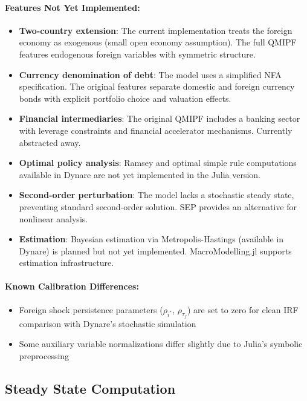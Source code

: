 \documentclass[12pt]{article}
\begin{document}
\paragraph{Features Not Yet Implemented:}
\begin{itemize}
\item \textbf{Two-country extension}: The current implementation treats the foreign economy as exogenous (small open economy assumption). The full QMIPF features endogenous foreign variables with symmetric structure.
\item \textbf{Currency denomination of debt}: The model uses a simplified NFA specification. The original features separate domestic and foreign currency bonds with explicit portfolio choice and valuation effects.
\item \textbf{Financial intermediaries}: The original QMIPF includes a banking sector with leverage constraints and financial accelerator mechanisms. Currently abstracted away.
\item \textbf{Optimal policy analysis}: Ramsey and optimal simple rule computations available in Dynare are not yet implemented in the Julia version.
\item \textbf{Second-order perturbation}: The model lacks a stochastic steady state, preventing standard second-order solution. SEP provides an alternative for nonlinear analysis.
\item \textbf{Estimation}: Bayesian estimation via Metropolis-Hastings (available in Dynare) is planned but not yet implemented. MacroModelling.jl supports estimation infrastructure.
\end{itemize}

\paragraph{Known Calibration Differences:}
\begin{itemize}
\item Foreign shock persistence parameters ($\rho_{i^*}$, $\rho_{\tau_f}$) are set to zero for clean IRF comparison with Dynare's stochastic simulation
\item Some auxiliary variable normalizations differ slightly due to Julia's symbolic preprocessing
\end{itemize}

\subsection{Steady State Computation}
\end{document}
